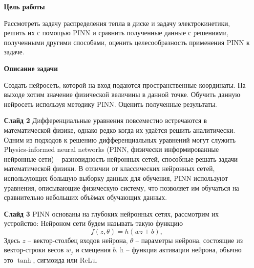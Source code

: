 \documentclass[a4paper,14pt]{extarticle} %
\author{Кузнецов Игорь}
\title{}
\date{\today}
\begin{document}
\def\figurename{Рисунок}
\newcommand{\brv}[1]{{\left| #1 \right|}}
\newcommand{\brr}[1]{{\left( #1 \right)}}
\newcommand{\brs}[1]{{\left[ #1 \right]}}
\newcommand{\brc}[1]{{\left\{ #1 \right\}}}
\newcommand{\brn}[1]{{\left\lVert #1 \right\rVert}}
\newcommand{\bra}[1]{{\left\langle #1 \right\rangle}}
\newcommand{\brrl}[1]{{\left( #1 \right]}}
\newcommand{\brrr}[1]{{\left[ #1 \right)}}
\newcommand{\under}[2]{{\underset{#2}{\underbrace{#1}}}}
\newcommand{\strm}[1]{\underset{#1}{\rightarrow}}

\textbf{Цель работы}

Рассмотреть задачу распределения тепла в диске и задачу электрокинетики, решить их с помощью PINN и сравнить полученные данные с решениями, полученными другими способами, оценить целесообразность применения PINN к задаче.

\textbf{Описание задачи}

Создать нейросеть, которой на вход подаются пространственные координаты. На выходе хотим значение физической величины в данной точке. Обучить данную нейросеть используя методику PINN. Оценить полученные результаты.

\textbf{Слайд 2}
Дифференциальные уравнения повсеместно встречаются в математической физике, однако редко когда их удаётся решить аналитически. Одним из подходов к решению дифференциальных уравнений могут служить Physics-informed neural networks (PINN, физически информированные нейронные сети) -- разновидность нейронных сетей, способные решать задачи математической физики. В отличии от классических нейронных сетей, использующих большую выборку данных для обучения, PINN используют уравнения, описывающие физическую систему, что позволяет им обучаться на сравнительно небольших объёмах обучающих данных.

\textbf{Слайд 3}
PINN основаны на глубоких нейронных сетях, рассмотрим их устройство:
Нейроном сети будем называть такую функцию
\begin{equation*}
    f(z, \theta) = h(wz+b),
\end{equation*}
Здесь $z$ -- вектор-столбец входов нейрона, $\theta$ -- параметры нейрона, состоящие из вектор-строки весов $w_j$ и смещения $b$. h -- функция активации нейрона, обычно это $\tanh$, сигмоида или ReLu.
\end{document}
